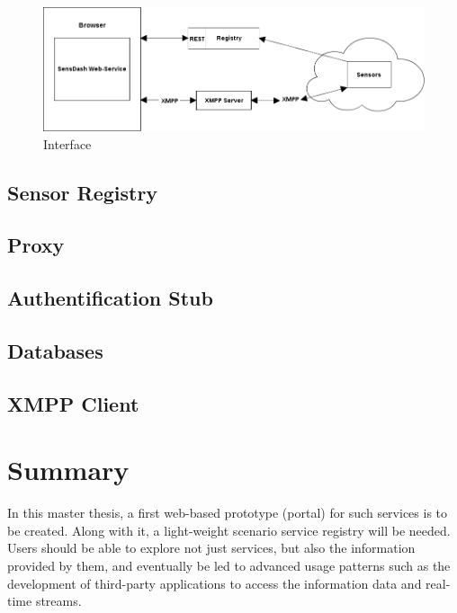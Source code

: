 \begin{figure}[!ht]
\centering
\includegraphics[scale=0.5]{images/Interface.png}   
\caption[Interface]{Interface}
\label{img:interfaces}                           
\end{figure}

\subsection{Sensor Registry}
\subsection{Proxy}
\subsection{Authentification Stub}
\subsection{Databases}
\subsection{XMPP Client}

\section{Summary}
In this master thesis, a first web-based prototype (portal) for such services is to be
created. Along with it, a light-weight scenario service registry will be needed. Users
should be able to explore not just services, but also the information provided by
them, and eventually be led to advanced usage patterns such as the development
of third-party applications to access the information data and real-time streams.